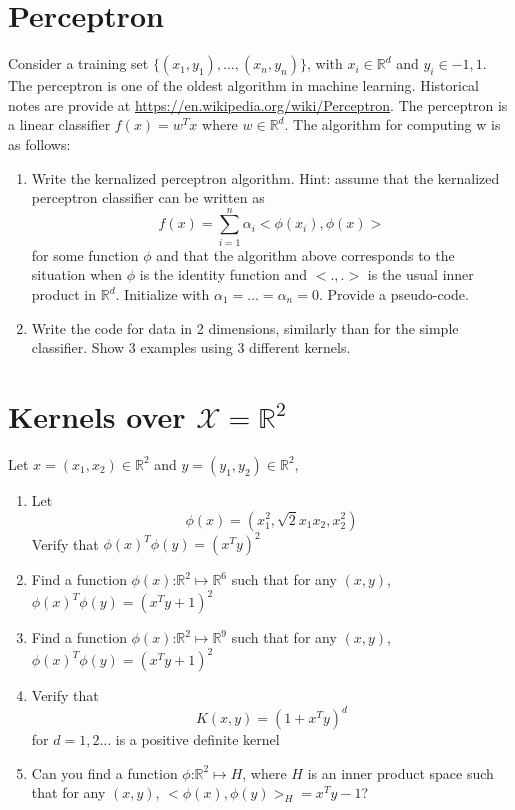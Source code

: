 \documentclass[12pt]{article}
\begin{document}
 \section{Perceptron}
Consider a training set $\{(x_1,y_1),\ldots,(x_n,y_n)\}$, with $x_i \in \mathbb{R}^d$ and $y_i \in {-1,1}$. The perceptron is one of the oldest algorithm in machine learning. Historical notes are provide at \url{https://en.wikipedia.org/wiki/Perceptron}. 
The perceptron is a linear classifier $f(x)=w^Tx$ where $w \in \mathbb{R}^d$. 
The algorithm for computing w is as follows: 
\begin{enumerate}
\item Write the kernalized perceptron algorithm. Hint: assume that the kernalized perceptron classifier can be written as 
$$f(x) =\sum_{i=1}^n \alpha_i <\phi(x_i),\phi(x)>$$
for some function $\phi$ and that the algorithm above corresponds to the situation when  $\phi$ is the identity function and $<.,.>$ is the usual  inner product in $\mathbb{R}^d$. Initialize with $\alpha_1=\ldots=\alpha_n=0$. Provide a pseudo-code.     
\item Write the code for data in 2 dimensions, similarly than for the simple classifier. Show 3 examples using 3 different kernels. 
\end{enumerate}
\section{Kernels over $\mathcal{X}=\mathbb{R}^2$}
Let $x=(x_1,x_2) \in \mathbb{R}^2$ and $y=(y_1,y_2) \in \mathbb{R}^2$,
\begin{enumerate}
\item Let 
$$\phi(x)=(x_1^2,\sqrt{2}x_1x_2,x_2^2)$$
Verify that $\phi(x)^T\phi(y) = (x^Ty)^2$
\item Find a function $\phi(x)$:$\mathbb{R}^2 \mapsto \mathbb{R}^6$ such that for any $(x,y)$, $\phi(x)^T\phi(y) = (x^Ty+1)^2$
\item Find a function $\phi(x)$:$\mathbb{R}^2 \mapsto \mathbb{R}^9$ such that for any $(x,y)$, $\phi(x)^T\phi(y) = (x^Ty+1)^2$
\item Verify that $$K(x,y)=(1+x^Ty)^d$$ for $d=1,2\ldots$ is a positive definite kernel
\item Can you find a function $\phi$:$\mathbb{R}^2 \mapsto H$, where $H$ is an inner product space such that for any $(x,y)$, $<\phi(x),\phi(y)>_H = x^Ty -1$? 
\end{enumerate}
\end{document}
